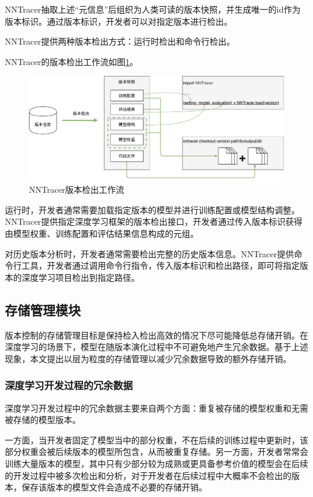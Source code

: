 \documentclass{cjc}
\begin{document}
NNTracer抽取上述“元信息”后组织为人类可读的版本快照，并生成唯一的id作为版本标识。通过版本标识，开发者可以对指定版本进行检出。

NNTracer提供两种版本检出方式：运行时检出和命令行检出。

NNTracer的版本检出工作流如图\ref{checkout}。

\begin{figure}[htb]
  \centering
  \includegraphics[width=\linewidth]{checkout.pdf}
  \caption{NNTracer版本检出工作流}
  \label{checkout}
\end{figure}

运行时，开发者通常需要加载指定版本的模型并进行训练配置或模型结构调整。NNTracer提供指定深度学习框架的版本检出接口，开发者通过传入版本标识获得由模型权重、训练配置和评估结果信息构成的元组。

对历史版本分析时，开发者通常需要检出完整的历史版本信息。NNTracer提供命令行工具，开发者通过调用命令行指令，传入版本标识和检出路径，即可将指定版本的深度学习项目检出到指定路径。

\subsection{存储管理模块}
版本控制的存储管理目标是保持检入检出高效的情况下尽可能降低总存储开销。在深度学习的场景下，模型在随版本演化过程中不可避免地产生冗余数据。基于上述现象，本文提出以层为粒度的存储管理以减少冗余数据导致的额外存储开销。

\subsubsection{深度学习开发过程的冗余数据}
深度学习开发过程中的冗余数据主要来自两个方面：重复被存储的模型权重和无需被存储的模型版本。

一方面，当开发者固定了模型当中的部分权重，不在后续的训练过程中更新时，该部分权重会被后续版本的模型所包含，从而被重复存储。另一方面，开发者常常会训练大量版本的模型，其中只有少部分较为成熟或更具备参考价值的模型会在后续的开发过程中被多次检出和分析，对于开发者在后续过程中大概率不会检出的版本，保存该版本的模型文件会造成不必要的存储开销。
\end{document}

